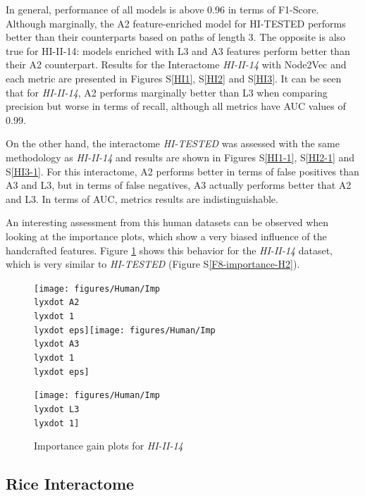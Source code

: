 In general, performance of all models is above 0.96 in terms of F1-Score.
Although marginally, the A2 feature-enriched model for HI-TESTED performs
better than their counterparts based on paths of length 3. The opposite
is also true for HI-II-14: models enriched with L3 and A3 features
perform better than their A2 counterpart. Results for the Interactome
\emph{HI-II-14} with Node2Vec and each metric are presented in Figures
S\ref{HI1}, S\ref{HI2} and S\ref{HI3}. It can be seen that for
\emph{HI-II-14}, A2 performs marginally better than L3 when comparing
precision but worse in terms of recall, although all metrics have
AUC values of 0.99.

On the other hand, the interactome \emph{HI-TESTED} was assessed with
the same methodology as \emph{HI-II-14} and results are shown in Figures
S\ref{HI1-1}, S\ref{HI2-1} and S\ref{HI3-1}. For this interactome,
A2 performs better in terms of false positives than A3 and L3, but
in terms of false negatives, A3 actually performs better that A2 and
L3. In terms of AUC, metrics results are indistinguishable. 

An interesting assessment from this human datasets can be observed
when looking at the importance plots, which show a very biased influence
of the handcrafted features. Figure \ref{F8-importance-H1} shows
this behavior for the \emph{HI-II-14} dataset, which is very similar
to \emph{HI-TESTED} (Figure S\ref{F8-importance-H2}).

\begin{figure}[h]
\noindent \begin{centering}
\caption{\label{F8-importance-H1}Importance gain plots for \emph{HI-II-14}}
\par\end{centering}
\begin{centering}
\texttt{[image: figures/Human/Imp\\lyxdot A2\\lyxdot 1\\lyxdot eps]}\texttt{[image: figures/Human/Imp\\lyxdot A3\\lyxdot 1\\lyxdot eps]}
\par\end{centering}
\centering{}\texttt{[image: figures/Human/Imp\\lyxdot L3\\lyxdot 1]}
\end{figure}


\subsection*{Rice Interactome}

